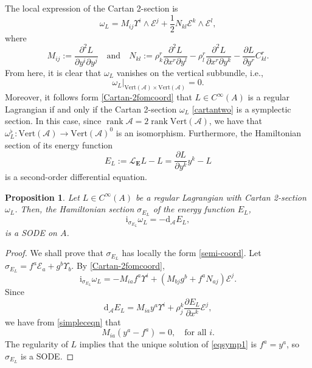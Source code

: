 \documentclass[12pt,letterpaper]{article}
\newcommand{\A}{\mathscr{A}}
\newtheorem{proposition}[theorem]{Proposition}
\numberwithin{equation}{section}
\begin{document}
The local expression of the Cartan 2-section is
\begin{equation}\label{Cartan-2fomcoord}
  \omega_L = M_{ij}\Upsilon^i\wedge \mathcal{E}^j + \frac{1}{2}N_{kl}\mathcal{E}^k\wedge \mathcal{E}^l,
\end{equation}
where
\[
  M_{ij} := \frac{\partial^2 L}{\partial y^i\partial y^j}
  \quad\text{and}\quad
  N_{kl} :=  \rho^r_k\frac{\partial^2 L}{\partial x^r\partial y^l}-\rho^r_l\frac{\partial^2 L}{\partial x^r\partial y^k}-\frac{\partial L}{\partial y^r}C^r_{kl}.
\]
From here, it is clear that $\omega_L$ vanishes on the vertical subbundle, i.e.,   
$$\left. \omega_L \right|_{\mathrm{Vert}(\A) \times \mathrm{Vert}(\A)}=0.$$
Moreover, it follows form \eqref{Cartan-2fomcoord} that $ L \in C^\infty(A)$ is a regular Lagrangian if and only if
the Cartan 2-section $\omega_L $ \eqref{cartantwo} is a symplectic section.
In this case, since $\operatorname{rank}\A=2\operatorname{rank} \mathrm{Vert}(\A)$, 
we have that $\omega_L^{\flat}:\mathrm{Vert}(\A)\to \mathrm{Vert}(\A)^0$ is an isomorphism.
Furthermore, the Hamiltonian section of its energy function
\begin{equation}\label{energyfunc}
E_L := \mathcal{L}_{\mathbf{E}} L - L = \frac{\partial L}{\partial y^k}y^k-L
\end{equation}
is a second-order differential equation.

\begin{proposition}\label{prop:sigmaSODE}
Let $ L \in C^\infty(A)$ be a regular Lagrangian with Cartan 2-section $\omega_L$. 
Then, the Hamiltonian section $\sigma_{E_L}$ of the energy function $E_L$,
\begin{equation}\label{simpleceqn}
\mathrm{i}_ {\sigma_{E_L}}\omega_L =-\mathrm{d}_{\A}E_L,
\end{equation}
is a SODE on $A$.
\end{proposition}

\begin{proof}
We shall prove that $\sigma_{E_L}$ has locally the form \eqref{semi-coord}. 
Let $\sigma_{E_L} = f^a\mathcal{E}_a+g^b\Upsilon_b$. By \eqref{Cartan-2fomcoord}, 
\begin{equation*}
\mathrm{i}_{\sigma_{E_L}} \omega_L = -  M_{ia}f^a \Upsilon^i+(M_{bj}g^b+f^aN_{aj})\mathcal{E}^j.
\end{equation*}
Since 
\begin{equation}\label{eq:dAEL}
\mathrm{d}_{\A}E_L =  M_{ia} y^a \Upsilon^i + \rho^k_j\frac{\partial E_L}{\partial x^k}\mathcal{E}^j,
\end{equation}
we have from \eqref{simpleceqn} that
\begin{equation}
 M_{ia}( y^a-f^a)=0, \quad\text{for all $i$.}  \label{eqsymp1}
\end{equation}
The regularity of $L$ implies that the unique solution of \eqref{eqsymp1} is $f^a=y^a$, so $\sigma_{E_L}$ is a SODE.
\end{proof}
\end{document}
